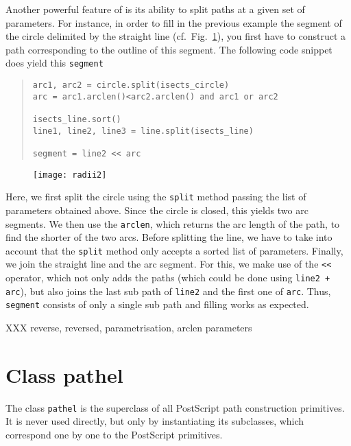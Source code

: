 Another powerful feature of \PyX{} is its ability to split paths at a
given set of parameters. For instance, in order to fill in the
previous example the segment of the circle delimited by the straight
line (cf.\ Fig.~\ref{fig:radii2}), you first have to construct a path
corresponding to the outline of this segment. The following code
snippet does yield this \verb|segment|
\begin{quote}
\begin{verbatim}
arc1, arc2 = circle.split(isects_circle)
arc = arc1.arclen()<arc2.arclen() and arc1 or arc2

isects_line.sort()
line1, line2, line3 = line.split(isects_line)

segment = line2 << arc
\end{verbatim}
\end{quote}
\begin{figure}
\centerline{\texttt{[image: radii2]}}
\label{fig:radii2}
\end{figure}
Here, we first split the circle using the \verb|split| method passing
the list of parameters obtained above. Since the circle is closed,
this yields two arc segments. We then use the \verb|arclen|, which
returns the arc length of the path, to find the shorter of the two
arcs. Before splitting the line, we have to take into account that
the \verb|split| method only accepts a sorted list of parameters.
Finally, we join the straight line and the arc segment. For
this, we make use of the \verb|<<| operator, which not only adds
the paths (which could be done using \verb|line2 + arc|), but also
joins the last sub path of \verb|line2| and the first one of
\verb|arc|. Thus, \verb|segment| consists of only a single sub path
and filling works as expected.

XXX reverse, reversed, parametrisation, arclen parameters




\section{Class pathel}

The class \verb|pathel| is the superclass of all PostScript path
construction primitives. It is never used directly, but only by
instantiating its subclasses, which correspond one by one to the
PostScript primitives.

